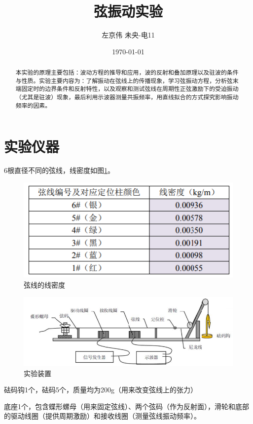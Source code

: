 \documentclass[a4paper,11pt]{article}
\title{弦振动实验}
\author{左京伟 \qquad 未央-电11 \qquad 2021012328}
\date{\today}
\begin{document}
\maketitle
\begin{abstract}
    本实验的原理主要包括：波动方程的推导和应用，波的反射和叠加原理以及驻波的条件与性质。实验主要内容为：了解振动在弦线上的传播现象，学习弦振动方程，分析弦末端固定时的边界条件和反射特性，以及观察和测试弦线在周期性正弦激励下的受迫振动（尤其是驻波）现象，最后利用示波器测量共振频率，用直线拟合的方式探究影响振动频率的因素。
\end{abstract}

\section{实验仪器}
    6根直径不同的弦线，线密度如图\ref{fig:弦线的线密度}。\\
    \begin{figure}[ht]
        \centering
        \includegraphics[scale=0.7]{弦线的线密度.png}
        \caption{弦线的线密度}
        \label{fig:弦线的线密度}
    \end{figure}

    \begin{figure}[ht]
        \centering
        \includegraphics[scale=0.6]{实验设备.png}
        \caption{实验装置}
        \label{fig:实验设备}
    \end{figure}

    砝码钩1个，砝码5个，质量均为200g（用来改变弦线上的张力）

    底座1个，包含蝶形螺母（用来固定弦线）、两个弦码（作为反射面），滑轮和底部的驱动线圈（提供周期激励）和接收线圈（测量弦线振动频率）。
\end{document}
